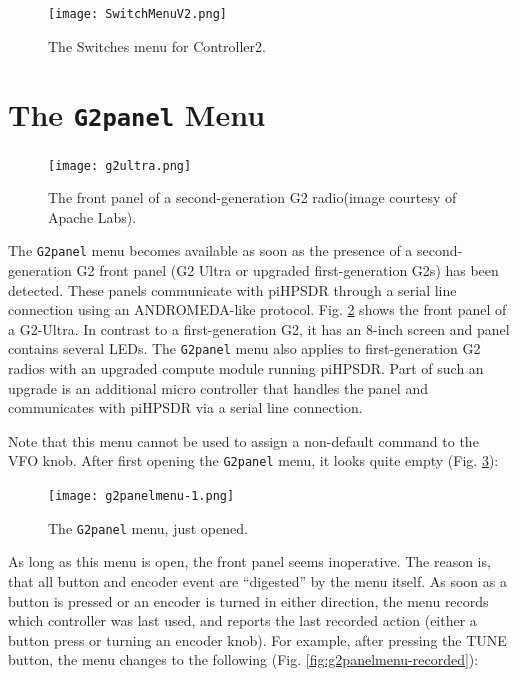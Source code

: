 \documentclass[12pt]{book}
\def\bltt#1{\texttt{\color{blue}#1}}
\def\pH{pi\-HPSDR\xspace}
\begin{document}
\begin{figure}[ht]
\center
\texttt{[image: SwitchMenuV2.png]}
\caption{The Switches menu for Controller2.}
\label{fig:SwitchMenuV2}
\end{figure}
\section{The \texttt{G2panel} Menu}
\label{sec:G2panelMenu}

\begin{figure}[ht]
\center
\texttt{[image: g2ultra.png]}
\caption{The front panel of a second-generation G2 radio(image courtesy of Apache Labs).}
\label{fig:g2ultrapanel}
\end{figure}

The \bltt{G2panel} menu becomes available as soon as the presence of a second-generation G2 front panel
(G2 Ultra or upgraded first-generation G2s) has been detected. These panels communicate with \pH through
a serial line connection using an ANDROMEDA-like protocol. Fig. \ref{fig:g2ultrapanel} shows the front
panel of a G2-Ultra. In contrast to a first-generation G2, it has an 8-inch screen and panel contains
several LEDs. The \bltt{G2panel} menu also applies to first-generation G2 radios with an upgraded
compute module running \pH. Part of such an upgrade is an additional micro controller that handles the
panel and communicates with \pH via a serial line connection.

Note that this menu cannot be used to assign a non-default command to the VFO knob.
After first opening the \bltt{G2panel} menu, it looks quite empty (Fig. \ref{fig:g2panelmenu-initial}):

\begin{figure}[ht]
\center
\texttt{[image: g2panelmenu-1.png]}
\caption{The \bltt{G2panel} menu, just opened.}
\label{fig:g2panelmenu-initial}
\end{figure}

As long as this menu is open, the front panel seems inoperative. The reason is, that all button and
encoder event are ``digested'' by the menu itself. As soon as a button is pressed or an encoder is
turned in either direction, the menu records which controller was last used, and reports the last
recorded action (either a button press or turning an encoder knob). For example, after pressing
the TUNE button, the menu changes to the following (Fig. \ref{fig:g2panelmenu-recorded}):
\end{document}
